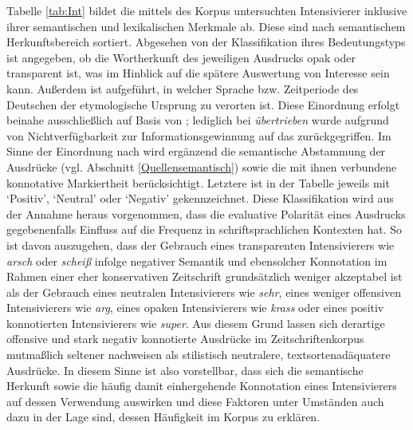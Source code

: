 Tabelle \ref{tab:Int} bildet die mittels des Korpus untersuchten Intensivierer inklusive ihrer semantischen und lexikalischen Merkmale ab. Diese sind nach semantischem Herkunftsbereich sortiert. Abgesehen von der Klassifikation ihres Bedeutungstyps ist angegeben, ob die Wortherkunft des jeweiligen Ausdrucks opak oder transparent ist, was im Hinblick auf die spätere Auswertung von Interesse sein kann. Außerdem ist aufgeführt, in welcher Sprache bzw. Zeitperiode des Deutschen der etymologische Ursprung zu verorten ist. Diese Einordnung erfolgt beinahe ausschließlich auf Basis von \citet[]{Pfeifer.1995}; lediglich bei \textit{übertrieben} wurde aufgrund von Nichtverfügbarkeit zur Informationsgewinnung auf das \citet[607f.]{Grimm.1956} zurückgegriffen. Im Sinne der Einordnung nach \citet[354ff.]{Claudi.2006} wird ergänzend die semantische Abstammung der Ausdrücke (vgl. Abschnitt \ref{Quellensemantisch}) sowie die mit ihnen verbundene konnotative Markiertheit berücksichtigt. Letztere ist in der Tabelle jeweils mit `Positiv', `Neutral' oder `Negativ' gekennzeichnet. Diese Klassifikation wird aus der Annahme heraus vorgenommen, dass die evaluative Polarität eines Ausdrucks gegebenenfalls Einfluss auf die Frequenz in schriftsprachlichen Kontexten hat. So ist davon auszugehen, dass der Gebrauch eines transparenten Intensivierers wie \textit{arsch} oder \textit{scheiß} infolge negativer Semantik und ebensolcher Konnotation im Rahmen einer eher konservativen Zeitschrift grundsätzlich weniger akzeptabel ist als der Gebrauch eines neutralen Intensivierers wie \textit{sehr}, eines weniger offensiven Intensivierers wie \textit{arg}, eines opaken Intensivierers wie \textit{krass} oder eines positiv konnotierten Intensivierers wie \textit{super}. Aus diesem Grund lassen sich derartige offensive und stark negativ konnotierte Ausdrücke im Zeitschriftenkorpus mutmaßlich seltener nachweisen als stilistisch neutralere, textsortenadäquatere Ausdrücke. In diesem Sinne ist also vorstellbar, dass sich die semantische Herkunft sowie die häufig damit einhergehende Konnotation eines Intensivierers auf dessen Verwendung auswirken und diese Faktoren unter Umständen auch dazu in der Lage sind, dessen Häufigkeit im Korpus zu erklären.

